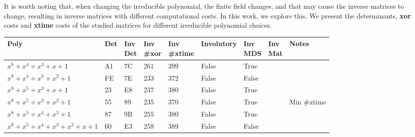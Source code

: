 It is worth noting that, when changing the irreducible polynomial, the finite field changes, and that may cause the inverse matrices to change, resulting in inverse matrices with different computational costs. In this work, we explore this. We present the determinants, \textbf{xor} costs and \textbf{xtime} costs of the studied matrices for different irreducible polynomial choices.


\begin{footnotesize}
\begin{longtable}{|l|l|l|l|l|l|l|l|l|}
\hline
\textbf{Poly}                           & \textbf{Det} & \shortstack{\textbf{Inv} \\ \textbf{Det}} & \shortstack{\textbf{Inv} \\ \textbf{\#xor}} & \shortstack{\textbf{Inv} \\ \textbf{\#xtime}} & \textbf{Involutory} & \shortstack{\textbf{Inv} \\ \textbf{MDS}} & \shortstack{\textbf{Inv} \\ \textbf{Mat}} & \textbf{Notes} \\ \hline
\endfirsthead
%
\endhead
%
$x^8 + x^4 + x^3 + x + 1$               & A1            & 7C                & 261                 & 399                   & False               & True              &              &                \\ \hline
$x^8 + x^4 + x^3 + x^2 + 1$             & FE            & 7E                & 233                 & 372                   & False               & False             &              &                \\ \hline
$x^8 + x^5 + x^3 + x + 1$               & 23            & E8                & 237                 & 380                   & False               & True              &              &                \\ \hline
$x^8 + x^5 + x^3 + x^2 + 1$             & 55            & 89                & 235                 & 370                   & False               & True              &              & Min \#xtime  \\ \hline
$x^8 + x^5 + x^4 + x^3 + 1$             & 87            & 9B                & 255                 & 380                   & False               & True              &              &                \\ \hline
$x^8 + x^5 + x^4 + x^3 + x^2 + x + 1$   & 60            & E3                & 258                 & 389                   & False               & False             &              &                \\ \hline

\end{longtable}
\end{footnotesize}
